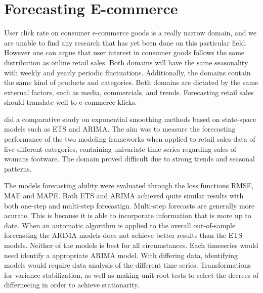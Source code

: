 \section{Forecasting E-commerce}
\label{section:RelatedWork:forecasting-ecommerce}
User click rate on consumer e-commerce goods is a really narrow domain,
and we are unable to find any research that has yet been done on this particular field.
However one can argue that user interest in consumer goods follows the same distribution
as online retail sales.
Both domains will have the same seasonality with weekly and yearly periodic fluctuations.
Additionally, the domains contain the same kind of products and categories.
Both domains are dictated by the same external factors, such as media, commercials, 
and trends.
Forecasting retail sales should translate well to e-commerce klicks.


\cite{Ramos2015} did a comparative study on exponential smoothing methods
based on state-space models such as ETS and ARIMA.
The aim was to measure the forecasting performance of the two modeling frameworks
when applied to retail sales data of five different categories,
containing univariate time series regarding sales of womans footware.
The domain proved difficult due to strong trends and seasonal patterns.


The models forecasting ability were evaluated through the loss functions RMSE, MAE and MAPE.
Both ETS and ARIMA achieved quite similar results with both one-step and multi-step forecastign.
Multi-step forecasts are generally more acurate.
This is because it is able to incorporate information that is more up to date.
When an automatic algorithm is applied to the overall out-of-sample
forecasting the ARIMA models does not achieve better results than the ETS models.
Neither of the models is best for all circumstances.
Each timeseries would need identify a appropriate ARIMA model.
With differing data, identifying models would require data analysis of the different time series.
Transformations for variance stabilization, as well as making unit-root tests to select the decrees of differnecing in order to achieve stationarity.




